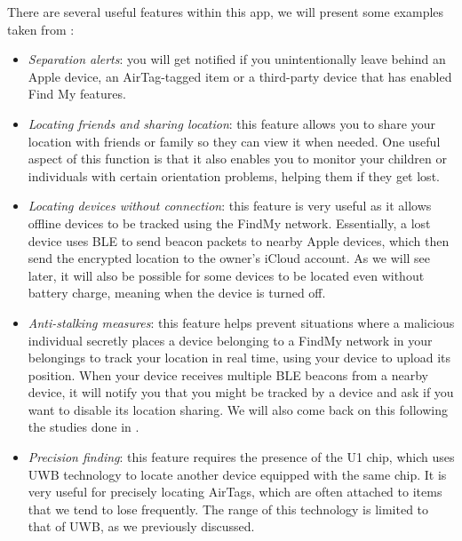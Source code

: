 \documentclass[english]{article}
\begin{document}
There are several useful features within this app, we will present some examples taken from \cite{Clover_2022}:
\begin{itemize}
  \item \textit{Separation alerts}: you will get notified if you unintentionally leave behind an Apple device, an AirTag-tagged item or a third-party device that has enabled Find My features.
  \item \textit{Locating friends and sharing location}: this feature allows you to share your location with friends or family so they can view it when needed. One useful aspect of this function is that it also enables you to monitor your children or individuals with certain orientation problems, helping them if they get lost.
  \item \textit{Locating devices without connection}: this feature is very useful as it allows offline devices to be tracked using the FindMy network. Essentially, a lost device uses BLE to send beacon packets to nearby Apple devices, which then send the encrypted location to the owner's iCloud account. As we will see later, it will also be possible for some devices to be located even without battery charge, meaning when the device is turned off.
  \item \textit{Anti-stalking measures}: this feature helps prevent situations where a malicious individual secretly places a device belonging to a FindMy network in your belongings to track your location in real time, using your device to upload its position. When your device receives multiple BLE beacons from a nearby device, it will notify you that you might be tracked by a device and ask if you want to disable its location sharing. We will also come back on this following the studies done in \cite{airguard}.
  \item \textit{Precision finding}: this feature requires the presence of the U1 chip, which uses UWB technology to locate another device equipped with the same chip. It is very useful for precisely locating AirTags, which are often attached to items that we tend to lose frequently. The range of this technology is limited to that of UWB, as we previously discussed.
\end{itemize}
\end{document}
